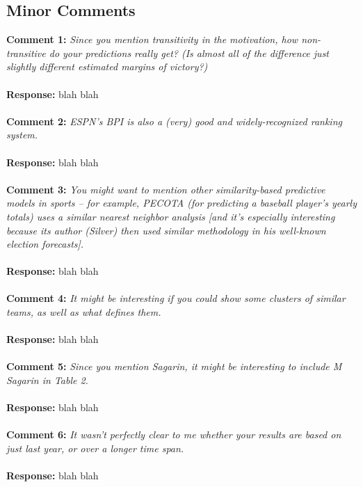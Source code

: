 \documentclass[11pt]{article} %
\begin{document}
\subsection*{Minor Comments}
{\bf Comment 1:} \emph{Since you mention transitivity in the motivation, how non-transitive do your predictions really get? (Is almost all of the difference just slightly different estimated margins of victory?)}\\
\\
{\bf Response:} blah blah\\
\\
{\bf Comment 2:} \emph{ESPN's BPI is also a (very) good and widely-recognized ranking system.}\\
\\
{\bf Response:} blah blah\\
\\
{\bf Comment 3:} \emph{You might want to mention other similarity-based predictive models in sports -- for example, PECOTA (for predicting a baseball player's yearly totals) uses a similar nearest neighbor analysis [and it's especially interesting because its author (Silver) then used similar methodology in his well-known election forecasts].}\\
\\
{\bf Response:} blah blah\\
\\
{\bf Comment 4:} \emph{It might be interesting if you could show some clusters of similar teams, as well as what defines them.}\\
\\
{\bf Response:} blah blah\\
\\
{\bf Comment 5:} \emph{Since you mention Sagarin, it might be interesting to include M Sagarin in Table 2.}\\
\\
{\bf Response:} blah blah\\
\\
{\bf Comment 6:} \emph{It wasn't perfectly clear to me whether your results are based on just last year, or over a longer time span.}\\
\\
{\bf Response:} blah blah
\end{document}

